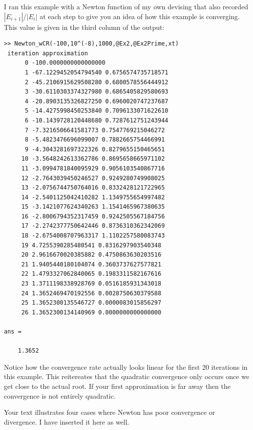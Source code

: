 \documentclass [titlepage,12pt,letter] {article}
\begin{document}
I ran this example with a Newton function of my own devising that also recorded $|E_{i+1}|$/$|E_i|$ at each step to give you an idea of how this example is converging. This value is given in the third column of the output:

\begin{verbatim}
>> Newton_wCR(-100,10^(-8),1000,@Ex2,@Ex2Prime,xt)
 iteration approximation 
      0 -100.0000000000000000 
      1 -67.1229452054794540 0.6756574735718571 
      2 -45.2106915629508280 0.6800578556444912 
      3 -30.6110303374327980 0.6865405829580693 
      4 -20.8903135326827250 0.6960020747237687 
      5 -14.4275998450253840 0.7096133071622610 
      6 -10.1439728120448680 0.7287612751243944 
      7 -7.3216506641581773 0.7547769215046272 
      8 -5.4823476696099007 0.7882665754466991 
      9 -4.3043281697322326 0.8279655150465651 
     10 -3.5648242613362786 0.8695658665971102 
     11 -3.0994781840095929 0.9056103540867716 
     12 -2.7643039450246527 0.9249280749908025 
     13 -2.0756744750764016 0.8332428121722965 
     14 -2.5401125042410282 1.1349755654997482 
     15 -3.1421077624340263 1.1541465967380635 
     16 -2.8006794352317459 0.9242505567184756 
     17 -2.2742377750642446 0.8736310362342069 
     18 -2.6754008707963317 1.1102257580083743 
     19 4.7255390285480541 0.8316297903540348 
     20 2.9616670020385882 0.4750863630203516 
     21 1.9405440180104074 0.3603737627577821 
     22 1.4793327062840065 0.1983311582167616 
     23 1.3711198338928769 0.0516185931343018 
     24 1.3652469470192556 0.0028750630379588 
     25 1.3652300135546727 0.0000083015856297 
     26 1.3652300134140969 0.0000000000000000 

ans =

    1.3652
\end{verbatim}

\noindent
Notice how the convergence rate actually looks linear for the first 20 iterations in this example. This reitereates that the quadratic
convergence only occurs once we get close to the actual root. If your first approximation is far away then the convergence is not 
entirely quadratic.

Your text illustrates four cases where Newton has poor convergence or divergence. I have inserted it here as well.
\end{document}
